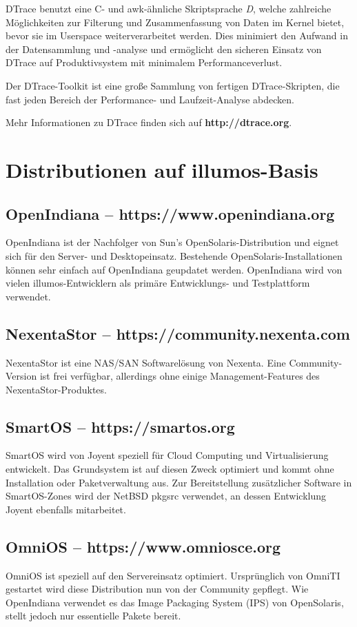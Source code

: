 \documentclass[11pt,foldmark,notumble]{leaflet}
\begin{document}
DTrace benutzt eine C- und awk-ähnliche Skriptsprache \emph{D},
welche zahlreiche Möglichkeiten zur Filterung und Zusammenfassung
von Daten im Kernel bietet, bevor sie im Userspace weiterverarbeitet
werden. Dies minimiert den Aufwand in der Datensammlung und -analyse
und ermöglicht den sicheren Einsatz von DTrace auf Produktivsystem mit
minimalem Performanceverlust.

Der DTrace-Toolkit ist eine große Sammlung von fertigen
DTrace-Skripten, die fast jeden Bereich der Performance- und
Laufzeit-Analyse abdecken.

Mehr Informationen zu DTrace finden sich auf \textbf{http://dtrace.org}.

\section{Distributionen auf illumos-Basis}
\subsection{OpenIndiana -- https://www.openindiana.org}
OpenIndiana ist der Nachfolger von Sun's OpenSolaris-Distribution und
eignet sich für den Server- und Desktopeinsatz. Bestehende
OpenSolaris-Installationen können sehr einfach auf OpenIndiana
geupdatet werden. OpenIndiana wird von vielen illumos-Entwicklern als
primäre Entwicklungs- und Testplattform verwendet.

\subsection{NexentaStor -- https://community.nexenta.com}
NexentaStor ist eine NAS/SAN Softwarelösung von Nexenta. Eine
Community-Version ist frei verfügbar, allerdings ohne einige
Management-Features des NexentaStor-Produktes.

\subsection{SmartOS -- https://smartos.org}
SmartOS wird von Joyent speziell für Cloud Computing und
Virtualisierung entwickelt. Das Grundsystem ist auf diesen Zweck
optimiert und kommt ohne Installation oder Paketverwaltung aus. Zur
Bereitstellung zusätzlicher Software in SmartOS-Zones wird der NetBSD
pkgsrc verwendet, an dessen Entwicklung Joyent ebenfalls mitarbeitet.

\subsection{OmniOS -- https://www.omniosce.org}
OmniOS ist speziell auf den Servereinsatz optimiert. Ursprünglich von
OmniTI gestartet wird diese Distribution nun von der Community
gepflegt. Wie OpenIndiana verwendet es das Image Packaging System (IPS)
von OpenSolaris, stellt jedoch nur essentielle Pakete bereit.
\end{document}
